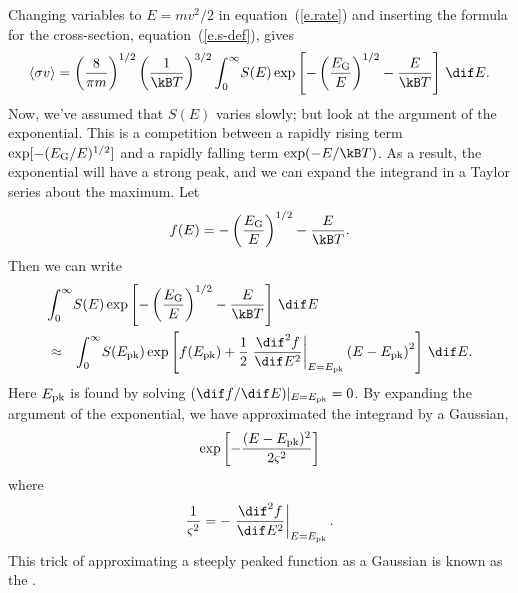 \begin{sidebar}
Changing variables to $E = mv^{2}/2$ in equation~(\ref{e.rate}) and inserting the formula for the cross-section, equation~(\ref{e.s-def}), gives
\begin{equation}\label{e.integral}
\langle\sigma v\rangle = \left(\frac{8}{\pi m}\right)^{1/2}\left(\frac{1}{\kB T}\right)^{3/2}\int_{0}^{\infty}\!S(E)\exp\left[-\left(\frac{\EG}{E}\right)^{1/2}-\frac{E}{\kB T}\right]\,\dif E.
\end{equation}
Now, we've assumed that $S(E)$ varies slowly; but look at the argument of the exponential. This is a competition between a rapidly rising term $\exp[-(E_{\mathrm{G}}/E)^{1/2}]$ and a rapidly falling term $\exp(-E/\kB T)$. As a result, the exponential will have a strong peak, and we can expand the integrand in a Taylor series about the maximum. Let 
\[
f(E) = -\left(\frac{\EG}{E}\right)^{1/2} - \frac{E}{\kB T}.
\]
Then we can write 
\begin{eqnarray*}
\lefteqn{\int_{0}^{\infty}\!S(E)\exp\left[-\left(\frac{\EG}{E}\right)^{1/2}-\frac{E}{\kB T}\right]\,\dif E}\\
&\approx&
	\int_{0}^{\infty}\! S(\Epk)\exp\left[f(\Epk) + \frac{1}{2}\left.\frac{\dif^{2} f}{\dif E^{2}}\right|_{E=\Epk}\left(E-\Epk\right)^{2}\right]\,\dif E.
\end{eqnarray*}
Here $E_{\mathrm{pk}}$ is found by solving $(\dif f/\dif E)|_{E=\Epk} = 0$. By expanding the argument of the exponential, we have approximated the integrand by a Gaussian,
\[
	\exp\left[-\frac{(E-E_{\mathrm{pk}})^{2}}{2\varsigma^{2}}\right]
\]
where
\[
	\frac{1}{\varsigma^{2}} = -\left.\frac{\dif^{2} f}{\dif E^{2}}\right|_{E=\Epk}.
\]
This trick of approximating a steeply peaked function as a Gaussian is known as the .


\end{sidebar}
